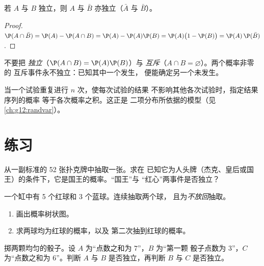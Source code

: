 \begin{proposition}\label{prop:g12:condprob:indepcompl}
若 $A$ 与 $B$ 独立，则 $A$ 与 $\bar B$ 亦独立（$\bar A$ 与
$\bar B$）。
\end{proposition}

\begin{proof}
$\P(A \cap \bar B) = \P(A) - \P(A \cap B) = \P(A) - \P(A)\P(B)
= \P(A)\bigl(1 - \P(B)\bigr) = \P(A)\,\P(\bar B)$.
\end{proof}

\begin{remark}
不要把 \emph{独立}（$\P(A\cap B) = \P(A)\P(B)$）与
\emph{互斥}（$A \cap B = \varnothing$）。两个概率非零的
互斥事件永不独立：已知其中一个发生，
便能确定另一个未发生。
\end{remark}

\begin{definition}[独立重复试验]\label{def:g12:condprob:repet}
当一个试验重复进行 $n$ 次，使每次试验的结果
不影响其他各次试验时，指定结果序列的概率
等于各次概率之积。这正是
二项分布所依据的模型（见\cref{ch:g12:randvar}）。
\end{definition}

\section{练习}

\begin{exercise}[$\star$]\label{exo:g12:condprob:1}
从一副标准的 52 张扑克牌中抽取一张。求在
已知它为人头牌（杰克、皇后或国王）的条件下，它是国王的概率。“国王”与
“红心”两事件是否独立？
\end{exercise}

\begin{exercise}[$\star$]\label{exo:g12:condprob:2}
一个缸中有 5 个红球和 3 个蓝球。连续抽取两个球，
且为\emph{不放回}抽取。
\begin{enumerate}
  \item 画出概率树状图。
  \item 求两球均为红球的概率，以及
        第二次抽到红球的概率。
\end{enumerate}
\end{exercise}

\begin{exercise}[$\star$]\label{exo:g12:condprob:3}
掷两颗均匀的骰子。设 $A$ 为“点数之和为 $7$”，$B$ 为“第一颗
骰子点数为 $3$”，$C$ 为“点数之和为 $6$”。判断 $A$ 与 $B$
是否独立，再判断 $B$ 与 $C$ 是否独立。
\end{exercise}

